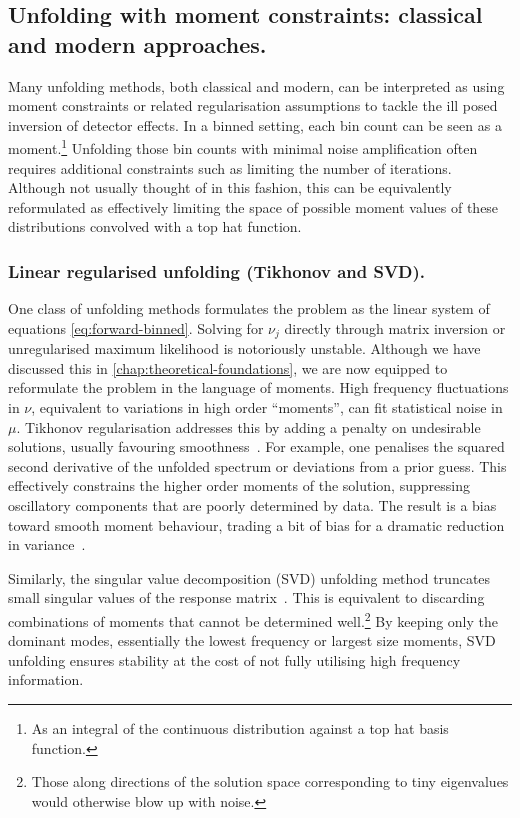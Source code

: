 {{    \subsection{Unfolding with moment constraints: classical and modern approaches.}
        Many unfolding methods, both classical and modern, can be interpreted as using moment constraints or related regularisation assumptions to tackle the ill posed inversion of detector effects.
        In a binned setting, each bin count can be seen as a moment.\footnote{As an integral of the continuous distribution against a top hat basis function.}
        Unfolding those bin counts with minimal noise amplification often requires additional constraints such as limiting the number of iterations.
        Although not usually thought of in this fashion, this can be equivalently reformulated as effectively limiting the space of possible moment values of these distributions convolved with a top hat function.
        
        \subsubsection{Linear regularised unfolding (Tikhonov and SVD).}
            One class of unfolding methods formulates the problem as the linear system of equations \cref{eq:forward-binned}.
            Solving for $\nu_j$ directly through matrix inversion or unregularised maximum likelihood is notoriously unstable.
            Although we have discussed this in \cref{chap:theoretical-foundations}, we are now equipped to reformulate the problem in the language of moments.
            High frequency fluctuations in $\nu$, equivalent to variations in high order ``moments'', can fit statistical noise in $\mu$.
            Tikhonov regularisation addresses this by adding a penalty on undesirable solutions, usually favouring smoothness~\cite{zbMATH03227378}.
            For example, one penalises the squared second derivative of the unfolded spectrum or deviations from a prior guess.
            This effectively constrains the higher order moments of the solution, suppressing oscillatory components that are poorly determined by data.
            The result is a bias toward smooth moment behaviour, trading a bit of bias for a dramatic reduction in variance~\cite{Blobel:2002pu}.
            
            Similarly, the singular value decomposition (SVD) unfolding method truncates small singular values of the response matrix~\cite{Schmelling:1993cd}.
            This is equivalent to discarding combinations of moments that cannot be determined well.\footnote{Those along directions of the solution space corresponding to tiny eigenvalues would otherwise blow up with noise.}
            By keeping only the dominant modes, essentially the lowest frequency or largest size moments, SVD unfolding ensures stability at the cost of not fully utilising high frequency information.
            
}}
